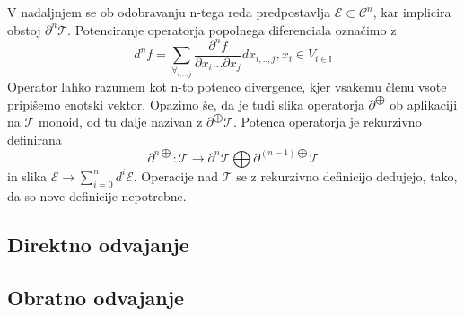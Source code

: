 \documentclass{article}
\newcommand{\II}{\mathbb{I}}
\newcommand{\E}{\mathcal{E}}
\newcommand{\T}{\mathcal{T}}
\begin{document}
 V nadaljnjem se ob odobravanju n-tega reda predpostavlja $\E\subset\mathcal{C}^n$, kar implicira obstoj $\partial^n\T$. Potenciranje operatorja popolnega diferenciala označimo z
 $$d^nf=\sum_{\forall_{i,..,j}}\frac{\partial^n f}{\partial x_i...\partial x_j}dx_{i,..,j}, x_i\in V_{i\in\II}$$
 Operator lahko razumem kot n-to potenco divergence, kjer vsakemu členu vsote pripišemo enotski vektor.
 Opazimo še, da je tudi slika operatorja $\partial^{\bigoplus}$ ob aplikaciji na $\T$ monoid, od tu dalje nazivan z $\partial^{\bigoplus}\T$. Potenca operatorja je rekurzivno definirana
 \begin{equation}\label{eq:dirSumFunN}
	\partial^{n\bigoplus}:\T\to\partial^{n}\T\bigoplus\partial^{(n-1)\bigoplus}\T
 \end{equation}
 in slika $\E\to\sum\limits_{i=0}^nd^i\E$. Operacije nad $\T$ se z rekurzivno definicijo dedujejo, tako, da so nove definicije nepotrebne.
 
\subsection{Direktno odvajanje}
\subsection{Obratno odvajanje}
\end{document}
